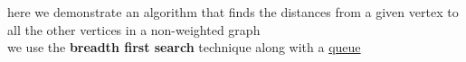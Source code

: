 \documentclass[a4paper,12pt]{article}
\begin{document}
\begin{my_example}
here we demonstrate an algorithm that finds the distances from a given vertex to all the other vertices in a non-weighted graph\\
we use the \textbf{breadth first search} technique along with a \href{data_structures.org}{queue}\\
\\
\end{my_example}
\end{document}
